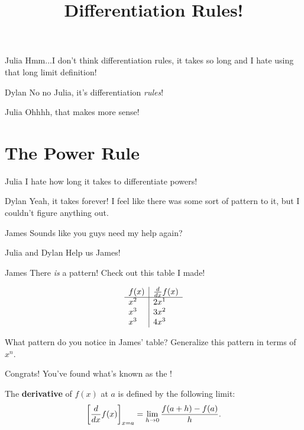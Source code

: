 \documentclass{ximera}
\title{Differentiation Rules!}
\begin{document}
\maketitle
\begin{dialogue}
\item[Julia] Hmm...I don't think differentiation rules, it takes so long and I hate using that long limit definition!
\item[Dylan] No no Julia, it's differentiation \textit{rules}!
\item[Julia] Ohhhh, that makes more sense!

\end{dialogue}
\section{The Power Rule}
\begin{dialogue}
\item[Julia] I hate how long it takes to differentiate powers!
\item[Dylan] Yeah, it takes forever! I feel like there was some sort of pattern to it, but I couldn't figure anything out.
\item[James] Sounds like you guys need my help again?
\item[Julia and Dylan] Help us James!
\item[James] There \textit{is} a pattern! Check out this table I made!
\end{dialogue}
\[
\begin{array}{l|l}
f(x) & \frac{d}{\mathop{}\!d x} f(x) \\
\hline
x^2 &  2x^1 \\
x^3 &  3x^2 \\
x^3 &  4x^3 
\end{array}
\]
\begin{question}
What pattern do you notice in James' table? Generalize this pattern in terms of $x^n$.
\begin{multipleChoice}
\end{multipleChoice}
\begin{feedback}[correct]
Congrats! You've found what's known as the !
\end{feedback}
\end{question}

\begin{definition}
  The \textbf{derivative} of $f(x)$ at $a$ is defined by the following limit:
  \[
  \bigg[ \frac{d}{dx} f(x) \bigg]_{x=a} = \lim_{h\to 0} \frac{f(a+h) - f(a)}{h}.
  \]
\end{definition}
\end{document}
